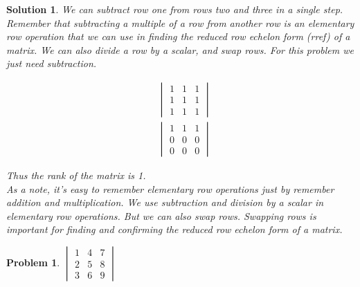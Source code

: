 \documentclass{article}
\newtheorem{problem}{Problem}
\newtheorem*{solution}{Solution}
\begin{document}
\begin{solution}

We can subtract row one from rows two and three in a single step. \\

Remember that subtracting a multiple of a row from another row is an elementary row operation that we can use in finding the reduced row echelon form (rref) of a matrix. We can also divide a row by a scalar, and swap rows. For this problem we just need subtraction.

\begin{align*}
&\begin{vmatrix}
1 & 1 & 1 \\
1 & 1 & 1 \\
1 & 1 & 1
\end{vmatrix} \\
&\begin{vmatrix}
1 & 1 & 1 \\
0 & 0 & 0 \\
0 & 0 & 0
\end{vmatrix}
\end{align*}

Thus the rank of the matrix is 1. \\

As a note, it's easy to remember elementary row operations just by remember addition and multiplication. We use subtraction and division by a scalar in elementary row operations. But we can also swap rows. Swapping rows is important for finding and confirming the reduced row echelon form of a matrix.
\end{solution}

\begin{problem}
$\begin{vmatrix}
1 & 4 & 7 \\
2 & 5 & 8 \\
3 & 6 & 9
\end{vmatrix}$
\end{problem}
\end{document}
